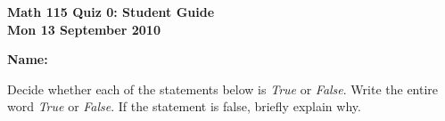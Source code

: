 \documentclass[11pt,letterpaper]{article}
\begin{document}
\flushleft
\begin{multicols}{2}


\begin{large}\textbf{Math 115 Quiz 0: Student Guide \\
Mon 13 September 2010}\end{large}

\textbf{Name:  }\underline{\hspace{35ex}}

\vspace{.5in}

\end{multicols}

\pagestyle{empty}


\flushleft

Decide whether each of the statements below is \emph{True} or \emph{False}.  Write the entire word \emph{True} or \emph{False}.  If the statement is false, briefly explain why.  
\end{document}
